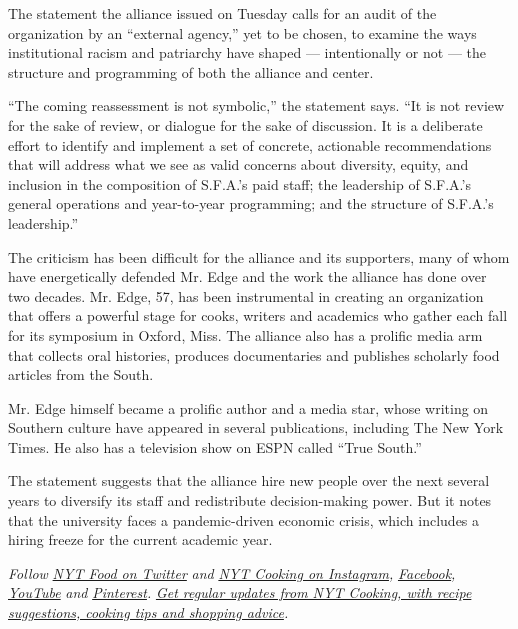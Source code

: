 The statement the alliance issued on Tuesday calls for an audit of the
organization by an ``external agency,'' yet to be chosen, to examine the
ways institutional racism and patriarchy have shaped --- intentionally
or not --- the structure and programming of both the alliance and
center.

``The coming reassessment is not symbolic,'' the statement says. ``It is
not review for the sake of review, or dialogue for the sake of
discussion. It is a deliberate effort to identify and implement a set of
concrete, actionable recommendations that will address what we see as
valid concerns about diversity, equity, and inclusion in the composition
of S.F.A.'s paid staff; the leadership of S.F.A.'s general operations
and year-to-year programming; and the structure of S.F.A.'s
leadership.''

The criticism has been difficult for the alliance and its supporters,
many of whom have energetically defended Mr. Edge and the work the
alliance has done over two decades. Mr. Edge, 57, has been instrumental
in creating an organization that offers a powerful stage for cooks,
writers and academics who gather each fall for its symposium in Oxford,
Miss. The alliance also has a prolific media arm that collects oral
histories, produces documentaries and publishes scholarly food articles
from the South.

Mr. Edge himself became a prolific author and a media star, whose
writing on Southern culture have appeared in several publications,
including The New York Times. He also has a television show on ESPN
called ``True South.''

The statement suggests that the alliance hire new people over the next
several years to diversify its staff and redistribute decision-making
power. But it notes that the university faces a pandemic-driven economic
crisis, which includes a hiring freeze for the current academic year.

\emph{Follow} \href{https://twitter.com/nytfood}{\emph{NYT Food on
Twitter}} \emph{and}
\href{https://www.instagram.com/nytcooking/}{\emph{NYT Cooking on
Instagram}}\emph{,}
\href{https://www.facebookcorewwwi.onion/nytcooking/}{\emph{Facebook}}\emph{,}
\href{https://www.youtube.com/nytcooking}{\emph{YouTube}} \emph{and}
\href{https://www.pinterest.com/nytcooking/}{\emph{Pinterest}}\emph{.}
\href{https://www.nytimes3xbfgragh.onion/newsletters/cooking}{\emph{Get
regular updates from NYT Cooking, with recipe suggestions, cooking tips
and shopping advice}}\emph{.}

